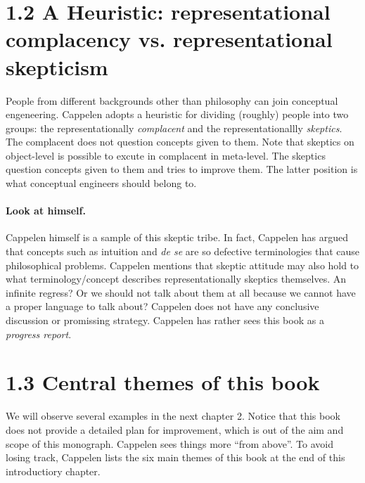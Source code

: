 \documentclass[
10pt, %
a4paper, %
twocolumn, %
landscape %
]{article}
\begin{document}
\section*{1.2 A Heuristic: representational complacency vs. representational skepticism}

People from different backgrounds other than philosophy can join conceptual engeneering. Cappelen adopts a heuristic for dividing (roughly) people into two groups: the representationally \emph{complacent} and the representationallly \emph{skeptics}.
The complacent does not question concepts given to them.
Note that skeptics on object-level is possible to excute in complacent in meta-level.
The skeptics question concepts given to them and tries to improve them. The latter position is what conceptual engineers should belong to.

\paragraph{Look at himself.}
Cappelen himself is a sample of this skeptic tribe.
In fact, Cappelen has argued that concepts such as intuition and \textit{de se} are so defective terminologies that cause philosophical problems.
Cappelen mentions that skeptic attitude may also hold to what terminology/concept describes representationally skeptics themselves. An infinite regress? Or we should not talk about them at all because we cannot have a proper language to talk about? Cappelen does not have any conclusive discussion or promissing strategy. Cappelen has rather sees this book as a \emph{progress report}.

\section*{1.3 Central themes of this book}
We will observe several examples in the next chapter 2. Notice that this book does not provide a detailed plan for improvement, which is out of the aim and scope of this monograph. Cappelen sees things more ``from above''.
To avoid losing track, Cappelen lists the six main themes of this book at the end of this introductiory chapter.
\end{document}
